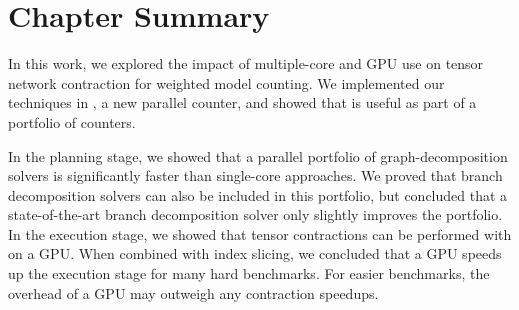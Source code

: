 \section{Chapter Summary}
In this work, we explored the impact of multiple-core and GPU use on tensor network contraction for weighted model counting. We implemented our techniques in , a new parallel counter, and showed that  is useful as part of a portfolio of counters.

In the planning stage, we showed that a parallel portfolio of graph-decomposition solvers is significantly faster than single-core approaches. We proved that branch decomposition solvers can also be included in this portfolio, but concluded that a state-of-the-art branch decomposition solver only slightly improves the portfolio. In the execution stage, we showed that tensor contractions can be performed with  on a GPU. When combined with index slicing, we concluded that a GPU speeds up the execution stage for many hard benchmarks. For easier benchmarks, the overhead of a GPU may outweigh any contraction speedups. 
